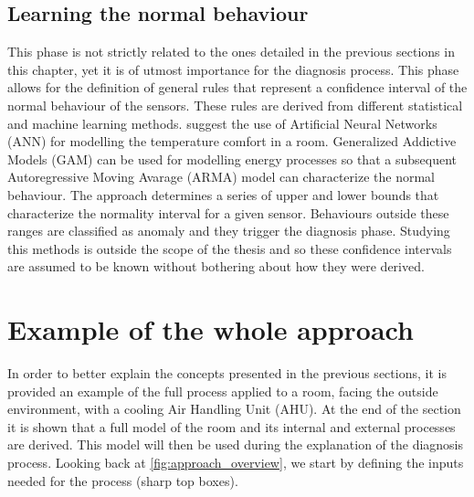 \subsection{Learning the normal behaviour}\label{subsec:learn_behaviour}
This phase is not strictly related to the ones detailed in the previous sections in this chapter, yet it is of utmost importance for the diagnosis process. This phase allows for the definition of general rules that represent a confidence interval of the normal behaviour of the sensors. These rules are derived from different statistical and machine learning methods. \textcite{inproceedings_cognitive_buildings} suggest the use of Artificial Neural Networks (ANN) for modelling the temperature comfort in a room. Generalized Addictive Models (GAM) can be used for modelling energy processes so that a subsequent Autoregressive Moving Avarage (ARMA) model can characterize the normal behaviour\cite{e2d}. The approach determines a series of upper and lower bounds that characterize the normality interval for a given sensor. Behaviours outside these ranges are classified as anomaly and they trigger the diagnosis phase. Studying this methods is outside the scope of the thesis and so these confidence intervals are assumed to be known without bothering about how they were derived.

\section{Example of the whole approach}
In order to better explain the concepts presented in the previous sections, it is provided an example of the full process applied to a room, facing the outside environment, with a cooling Air Handling Unit (AHU). At the end of the section it is shown that a full model of the room and its internal and external processes are derived. This model will then be used during the explanation of the diagnosis process. Looking back at \autoref{fig:approach_overview}, we start by defining the inputs needed for the process (sharp top boxes).
